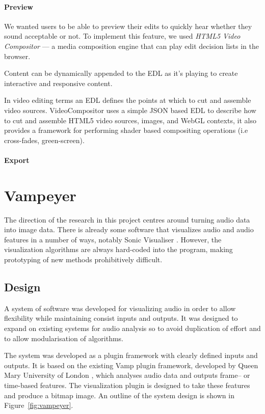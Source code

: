 \paragraph{Preview}
We wanted users to be able to preview their edits to quickly hear whether they sound acceptable or not.  To implement
this feature, we used \textit{HTML5 Video Compositor} --- a media composition engine that can play edit decision lists
in the browser.

Content can be dynamically appended to the EDL as it's playing to create interactive and responsive content.

In video editing terms an EDL defines the points at which to cut and assemble video sources. VideoCompositor uses a simple JSON based EDL to describe how to cut and assemble HTML5 video sources, images, and WebGL contexts, it also provides a framework for performing shader based compositing operations (i.e cross-fades, green-screen).



\paragraph{Export}


\clearpage
\section{Vampeyer}\label{sec:vampeyer}
The direction of the research in this project centres around turning audio data into image data. There is already some
software that visualizes audio and audio features in a number of ways, notably Sonic Visualiser \citep{Cannam2010}.
However, the visualization algorithms are always hard-coded into the program, making prototyping of new methods
prohibitively difficult.

\subsection{Design}
A system of software was developed for visualizing audio in order to allow flexibility while maintaining consist inputs
and outputs. It was designed to expand on existing systems for audio analysis so to avoid duplication of effort and to
allow modularisation of algorithms.

The system was developed as a plugin framework with clearly defined inputs and outputs. It is based on the existing
Vamp plugin framework, developed by Queen Mary University of London \citep{Cannam2010}, which analyses audio data and
outputs frame-- or time-based features. The visualization plugin is designed to take these features and produce a
bitmap image. An outline of the system design is shown in Figure~\ref{fig:vampeyer}.

